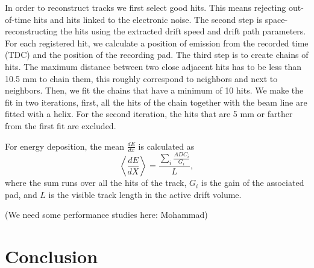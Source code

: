 \documentclass[twocolumn,showpacs,superscriptaddress,groupedaddress]{revtex4}
\begin{document}
In order to reconstruct tracks we first select good hits. This means rejecting 
out-of-time hits and hits linked to the electronic noise. The second step is 
space-reconstructing the hits using the extracted drift speed and drift path 
parameters. For each registered hit, we calculate a position of emission from 
the recorded time (TDC) and the position of the recording pad. The third step 
is to create chains of hits. The maximum distance between two close adjacent 
hits has to be less than 10.5 mm to chain them, this roughly correspond to 
neighbors and next to neighbors. Then, we fit the chains that have a minimum of 
10 hits. We make the fit in two iterations, first, all the hits of the chain 
together with the beam line are fitted with a helix. For the second iteration, 
the hits that are 5 mm or farther from the first fit are excluded.

For energy deposition, the mean $\frac{dE}{dx}$ is calculated as
\begin{equation}
 \left\langle \frac{dE}{dX} \right\rangle= \frac{\sum\limits_{i} \frac{ADC_{i}}{G_i}}{L},
\end{equation}
where the sum runs over all the hits of the track, $G_{i}$ is the gain of 
the associated pad, and $L$ is the visible track length in the active drift 
volume. 

(We need some performance studies here: Mohammad)

\section{Conclusion}




  
\end{document}
